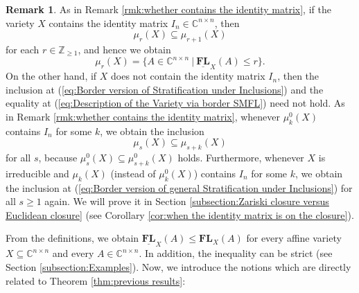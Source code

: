 \documentclass[reqno]{amsart}
\theoremstyle{definition}
\newtheorem{remark}[theorem]{Remark}
\numberwithin{equation}{section}
\begin{document}
\begin{remark}\label{rmk:border version of whether contains the identity matrix}
    As in Remark \ref{rmk:whether contains the identity matrix}, if the variety $X$ contains the identity matrix $I_n \in \mathbb{C}^{n \times n}$, then 
    \begin{equation}\label{eq:Border version of Stratification under Inclusions}
        \mu_r(X) \subseteq \mu_{r+1}(X)
    \end{equation}
    for each $r \in \mathbb{Z}_{\geq 1}$, and hence we obtain
    \begin{equation}\label{eq:Description of the Variety via border SMFL}
        \mu_r(X)=\{A \in \mathbb{C}^{n \times n}~|~\underline{\mathbf{FL}}_X(A) \leq r\}.
    \end{equation}
    On the other hand, if $X$ does not contain the identity matrix $I_n$, then the inclusion at (\ref{eq:Border version of Stratification under Inclusions}) and the equality at (\ref{eq:Description of the Variety via border SMFL}) need not hold. As in Remark \ref{rmk:whether contains the identity matrix}, whenever $\mu_k^0(X)$ contains $I_n$ for some $k$, we obtain the inclusion
    \begin{equation}\label{eq:Border version of general Stratification under Inclusions}
        \mu_s(X) \subseteq \mu_{s+k}(X)
    \end{equation}
    for all $s$, because $\mu_s^0(X) \subseteq \mu_{s+k}^0(X)$ holds. Furthermore, whenever $X$ is irreducible and $\mu_k(X)$ (instead of $\mu_k^0(X)$) contains $I_n$ for some $k$, we obtain the inclusion at (\ref{eq:Border version of general Stratification under Inclusions}) for all $s \geq 1$ again. We will prove it in Section \ref{subsection:Zariski closure versus Euclidean closure} (see Corollary \ref{cor:when the identity matrix is on the closure}).
\end{remark}

From the definitions, we obtain $\underline{\mathbf{FL}}_X(A) \leq \mathbf{FL}_X(A)$ for every affine variety $X \subseteq \mathbb{C}^{n \times n}$ and every $A \in \mathbb{C}^{n \times n}$. In addition, the inequality can be strict (see Section \ref{subsection:Examples}). Now, we introduce the notions which are directly related to Theorem \ref{thm:previous results}:
\end{document}
